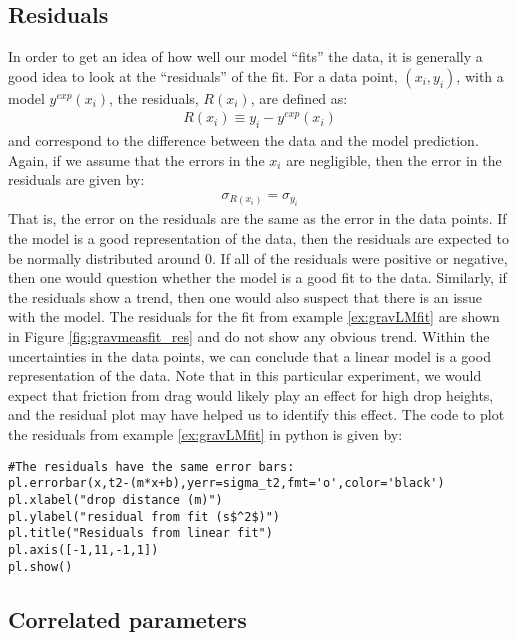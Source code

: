 \subsection{Residuals}
In order to get an idea of how well our model ``fits'' the data, it is generally a good idea to look at the ``residuals'' of the fit. For a data point, $(x_i,y_i)$, with a model $y^{exp}(x_i)$, the residuals, $R(x_i)$, are defined as:
\begin{align}
R(x_i)\equiv y_i-y^{exp}(x_i)
\end{align}
and correspond to the difference between the data and the model prediction. Again, if we assume that the errors in the $x_i$ are negligible, then the error in the residuals are given by:
\begin{align}
\sigma_{R(x_i)}=\sigma_{y_i}
\end{align}
That is, the error on the residuals are the same as the error in the data points. If the model is a good representation of the data, then the residuals are expected to be normally distributed around 0. If all of the residuals were positive or negative, then one would question whether the model is a good fit to the data. Similarly, if the residuals show a trend, then one would also suspect that there is an issue with the model. The residuals for the fit from example \ref{ex:gravLMfit} are shown in Figure \ref{fig:gravmeasfit_res} and do not show any obvious trend. Within the uncertainties in the data points, we can conclude that a linear model is a good representation of the data. Note that in this particular experiment, we would expect that friction from drag would likely play an effect for high drop heights, and the residual plot may have helped us to identify this effect. The code to plot the residuals from example \ref{ex:gravLMfit} in python is given by:
\begin{lstlisting}[frame=single] 
#The residuals have the same error bars:
pl.errorbar(x,t2-(m*x+b),yerr=sigma_t2,fmt='o',color='black')
pl.xlabel("drop distance (m)")
pl.ylabel("residual from fit (s$^2$)")
pl.title("Residuals from linear fit")
pl.axis([-1,11,-1,1])
pl.show()
\end{lstlisting} 



\subsection{Correlated parameters}

